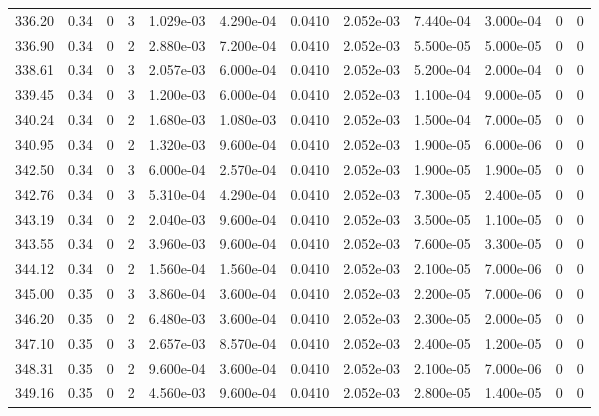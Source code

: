 \documentclass[preview]{standalone}
\begin{document}
{{{{{{{{{{{{\begin{tabular}{L{1.2cm}C{1.2cm} C{0.3cm}C{0.5cm} C{1.4cm}C{1.4cm} C{1.4cm}C{1.4cm} C{1.6cm}C{1.6cm} C{1.6cm}C{1.6cm}}
  336.20  &  0.34  & 0     &  3 &  1.029e-03  & 4.290e-04  &  0.0410&   2.052e-03& 7.440e-04 & 3.000e-04   &  0 & 0  \\ 
  336.90  &  0.34  & 0     &  2 &  2.880e-03  & 7.200e-04  &  0.0410&   2.052e-03& 5.500e-05 & 5.000e-05   &  0 & 0  \\ 
  338.61  &  0.34  & 0     &  3 &  2.057e-03  & 6.000e-04  &  0.0410&   2.052e-03& 5.200e-04 & 2.000e-04   &  0 & 0  \\ 
  339.45  &  0.34  & 0     &  3 &  1.200e-03  & 6.000e-04  &  0.0410&   2.052e-03& 1.100e-04 & 9.000e-05   &  0 & 0  \\ 
  340.24  &  0.34  & 0     &  2 &  1.680e-03  & 1.080e-03  &  0.0410&   2.052e-03& 1.500e-04 & 7.000e-05   &  0 & 0  \\ 
  340.95  &  0.34  & 0     &  2 &  1.320e-03  & 9.600e-04  &  0.0410&   2.052e-03& 1.900e-05 & 6.000e-06   &  0 & 0  \\ 
  342.50  &  0.34  & 0     &  3 &  6.000e-04  & 2.570e-04  &  0.0410&   2.052e-03& 1.900e-05 & 1.900e-05   &  0 & 0  \\ 
  342.76  &  0.34  & 0     &  3 &  5.310e-04  & 4.290e-04  &  0.0410&   2.052e-03& 7.300e-05 & 2.400e-05   &  0 & 0  \\ 
  343.19  &  0.34  & 0     &  2 &  2.040e-03  & 9.600e-04  &  0.0410&   2.052e-03& 3.500e-05 & 1.100e-05   &  0 & 0  \\ 
  343.55  &  0.34  & 0     &  2 &  3.960e-03  & 9.600e-04  &  0.0410&   2.052e-03& 7.600e-05 & 3.300e-05   &  0 & 0  \\ 
  344.12  &  0.34  & 0     &  2 &  1.560e-04  & 1.560e-04  &  0.0410&   2.052e-03& 2.100e-05 & 7.000e-06   &  0 & 0  \\ 
  345.00  &  0.35  & 0     &  3 &  3.860e-04  & 3.600e-04  &  0.0410&   2.052e-03& 2.200e-05 & 7.000e-06   &  0 & 0  \\ 
  346.20  &  0.35  & 0     &  2 &  6.480e-03  & 3.600e-04  &  0.0410&   2.052e-03& 2.300e-05 & 2.000e-05   &  0 & 0  \\ 
  347.10  &  0.35  & 0     &  3 &  2.657e-03  & 8.570e-04  &  0.0410&   2.052e-03& 2.400e-05 & 1.200e-05   &  0 & 0  \\ 
  348.31  &  0.35  & 0     &  2 &  9.600e-04  & 3.600e-04  &  0.0410&   2.052e-03& 2.100e-05 & 7.000e-06   &  0 & 0  \\ 
  349.16  &  0.35  & 0     &  2 &  4.560e-03  & 9.600e-04  &  0.0410&   2.052e-03& 2.800e-05 & 1.400e-05   &  0 & 0  \\ 
\hline 
\end{tabular} 

}}}}}}}}}}}}
\end{document}
